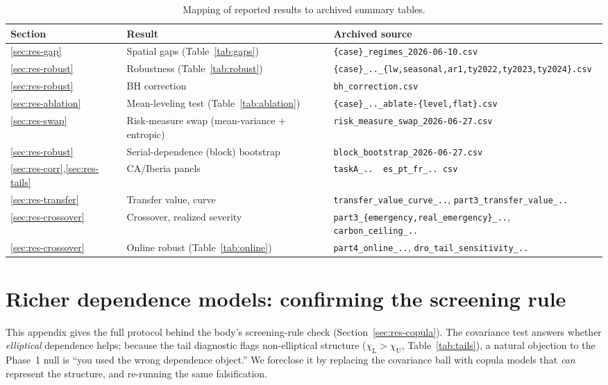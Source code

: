 \documentclass[12pt]{article}
\newcommand{\chiU}{\chi_{\mathrm{U}}}
\newcommand{\chiL}{\chi_{\mathrm{L}}}
\begin{document}
\begin{table}[h]
\centering\small
\caption{Mapping of reported results to archived summary tables.}
\label{tab:snapmap}
\begin{tabular}{l l >{\raggedright\arraybackslash}p{}}
\toprule
Section & Result & Archived source\\
\midrule
\ref{sec:res-gap} & Spatial gaps (Table~\ref{tab:gaps}) &
\texttt{\{case\}\_regimes\_2026-06-10.csv}\\
\ref{sec:res-robust} & Robustness (Table~\ref{tab:robust}) &
\texttt{\{case\}\_..\_\{lw,seasonal,ar1,ty2022,ty2023,ty2024\}.csv}\\
\ref{sec:res-robust} & BH correction & \texttt{bh\_correction.csv}\\
\ref{sec:res-ablation} & Mean-leveling test (Table~\ref{tab:ablation}) &
\texttt{\{case\}\_..\_ablate-\{level,flat\}.csv}\\
\ref{sec:res-swap} & Risk-measure swap (mean-variance + entropic) &
\texttt{risk\_measure\_swap\_2026-06-27.csv}\\
\ref{sec:res-robust} & Serial-dependence (block) bootstrap &
\texttt{block\_bootstrap\_2026-06-27.csv}\\
\ref{sec:res-corr},\ref{sec:res-tails} & CA/Iberia panels &
\texttt{taskA\_..\, es\_pt\_fr\_..\,csv}\\
\ref{sec:res-transfer} & Transfer value, curve &
\texttt{transfer\_value\_curve\_..}, \texttt{part3\_transfer\_value\_..}\\
\ref{sec:res-crossover} & Crossover, realized severity &
\texttt{part3\_\{emergency,real\_emergency\}\_..}, \texttt{carbon\_ceiling\_..}\\
\ref{sec:res-crossover} & Online robust (Table~\ref{tab:online}) &
\texttt{part4\_online\_..}, \texttt{dro\_tail\_sensitivity\_..}\\
\bottomrule
\end{tabular}
\end{table}

\section{Richer dependence models: confirming the screening rule}\label{app:copula}
This appendix gives the full protocol behind the body's screening-rule check
(Section~\ref{sec:res-copula}). The covariance test answers whether \emph{elliptical}
dependence helps; because the tail diagnostic flags non-elliptical structure
($\chiL>\chiU$, Table~\ref{tab:tails}), a natural objection to the Phase~1 null is
``you used the wrong dependence object.'' We foreclose it by replacing the covariance
ball with copula models that \emph{can} represent the structure, and re-running the
same falsification.
\end{document}
